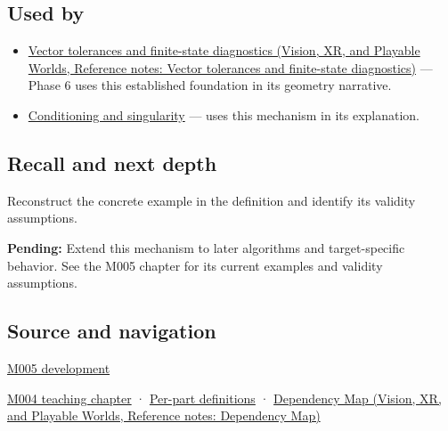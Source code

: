 \subsection{Used by}\label{appendix-0ec599f8ba27-used-by}

\hypertarget{appendix-0ec599f8ba27-used-by}{}

\begin{itemize}
\item
  \href{../07-Vision-XR-and-Playable-Worlds/main.pdf\#nameddest=appendix-b5b83329215b}{Vector tolerances and finite-state diagnostics (Vision, XR, and Playable Worlds, Reference notes: Vector tolerances and finite-state diagnostics)} --- Phase 6 uses this established foundation in its geometry narrative.
\item
  \hyperref[appendix-8f6a01f284a7]{Conditioning and singularity} --- uses this mechanism in its explanation.
\end{itemize}

\subsection{Recall and next depth}\label{appendix-0ec599f8ba27-recall-and-next-depth}

\hypertarget{appendix-0ec599f8ba27-recall-and-next-depth}{}

Reconstruct the concrete example in the definition and identify its validity assumptions.

\textbf{Pending:} Extend this mechanism to later algorithms and target-specific behavior. See the M005 chapter for its current examples and validity assumptions.

\subsection{Source and navigation}\label{appendix-0ec599f8ba27-source-and-navigation}

\hypertarget{appendix-0ec599f8ba27-source-and-navigation}{}

\hyperref[01-foundations-i-ch001-when-arithmetic-meets-uncertainty]{M005 development}

\hyperref[01-foundations-i-ch001-a-stretching-ruler-for-real-valued-quantities]{M004 teaching chapter} · \hyperref[appendix-fd090d982a15-m004---parts-61-76]{Per-part definitions} · \href{../07-Vision-XR-and-Playable-Worlds/main.pdf\#nameddest=appendix-4ad47bdd269a}{Dependency Map (Vision, XR, and Playable Worlds, Reference notes: Dependency Map)}
